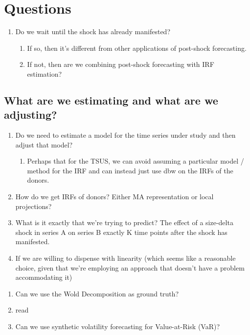 \documentclass[11pt]{article}
\theoremstyle{definition}
\begin{document}
\section{Questions}

\begin{enumerate}
  \item Do we wait until the shock has already manifested?
  \begin{enumerate}
    \item If so, then it's different from other applications of post-shock forecasting.
    \item If not, then are we combining post-shock forecasting with IRF estimation?
  \end{enumerate}
\end{enumerate}

\subsection{What are we estimating and what are we adjusting?}
\begin{enumerate}
  \item Do we need to estimate a model for the time series under study and then adjust that model?
  \begin{enumerate}
  \item Perhaps that for the TSUS, we can avoid assuming a particular model / method for the IRF and can instead just use dbw on the IRFs of the donors. 
  \end{enumerate}
  \item How do we get IRFs of donors? Either MA representation or local projections?
  \item What is it exactly that we're trying to predict?  The effect of a size-delta shock in series A on series B exactly K time points after the shock has manifested.
  \item If we are willing to dispense with linearity (which seems like a reasonable choice, given that we're employing an approach that doesn't have a problem accommodating it)
\end{enumerate}

\begin{enumerate}
    \item Can we use the Wold Decomposition as ground truth?
    \item read \citet{ho2023averaging}
    \item Can we use synthetic volatility forecasting for Value-at-Risk (VaR)?
\end{enumerate}
\end{document}
